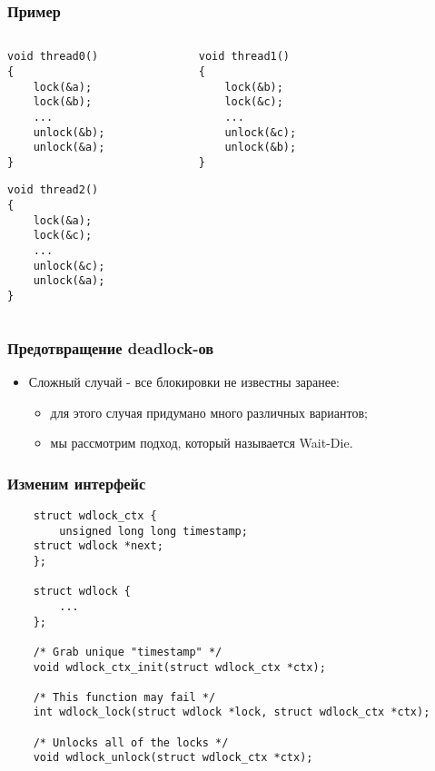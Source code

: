 \begin{frame}[fragile]
\frametitle{Пример}
\begin{columns}
    \begin{column}{.35\linewidth}
        \begin{lstlisting}
void thread0()
{
    lock(&a);
    lock(&b);
    ...
    unlock(&b);
    unlock(&a);
}
        \end{lstlisting}
        \begin{lstlisting}
void thread2()
{
    lock(&a);
    lock(&c);
    ...
    unlock(&c);
    unlock(&a);
}
        \end{lstlisting}
    \end{column}
    \begin{column}{.35\linewidth}
        \begin{lstlisting}
void thread1()
{
    lock(&b);
    lock(&c);
    ...
    unlock(&c);
    unlock(&b);
}
        \end{lstlisting}
    \end{column}
    \begin{column}{.3\linewidth}
    \end{column}
\end{columns}
\end{frame}

\begin{frame}
\frametitle{Предотвращение deadlock-ов}
\begin{itemize}
    \item<1->Сложный случай - все блокировки не известны заранее:
    \begin{itemize}
        \item<2->для этого случая придумано много различных вариантов;
        \item<3->мы рассмотрим подход, который называется Wait-Die.
    \end{itemize}
\end{itemize}
\end{frame}

\begin{frame}[fragile]
\frametitle{Изменим интерфейс}
\begin{lstlisting}
    struct wdlock_ctx {
        unsigned long long timestamp;
	struct wdlock *next;
    };

    struct wdlock {
        ...
    };

    /* Grab unique "timestamp" */
    void wdlock_ctx_init(struct wdlock_ctx *ctx);

    /* This function may fail */
    int wdlock_lock(struct wdlock *lock, struct wdlock_ctx *ctx);

    /* Unlocks all of the locks */
    void wdlock_unlock(struct wdlock_ctx *ctx);
\end{lstlisting}
\end{frame}

